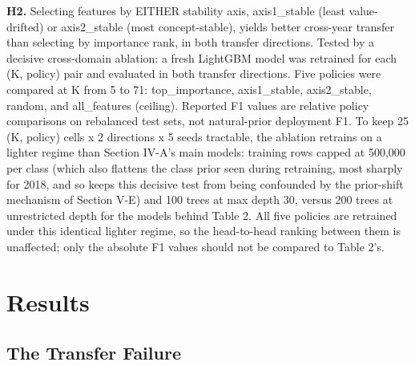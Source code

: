 \documentclass[conference]{IEEEtran}
\begin{document}
\textbf{H2.  }Selecting features by EITHER stability axis, axis1\_\allowbreak{}stable (least value-drifted) or axis2\_\allowbreak{}stable (most concept-stable), yields better cross-year transfer than selecting by importance rank, in both transfer directions. Tested by a decisive cross-domain ablation: a fresh LightGBM model was retrained for each (K, policy) pair and evaluated in both transfer directions. Five policies were compared at K from 5 to 71: top\_\allowbreak{}importance, axis1\_\allowbreak{}stable, axis2\_\allowbreak{}stable, random, and all\_\allowbreak{}features (ceiling). Reported F1 values are relative policy comparisons on rebalanced test sets, not natural-prior deployment F1. To keep 25 (K, policy) cells x 2 directions x 5 seeds tractable, the ablation retrains on a lighter regime than Section IV-A's main models: training rows capped at 500{,}000 per class (which also flattens the class prior seen during retraining, most sharply for 2018, and so keeps this decisive test from being confounded by the prior-shift mechanism of Section V-E) and 100 trees at max depth 30, versus 200 trees at unrestricted depth for the models behind Table 2. All five policies are retrained under this identical lighter regime, so the head-to-head ranking between them is unaffected; only the absolute F1 values should not be compared to Table 2's.\par\medskip

\section{Results}

\subsection{The Transfer Failure}
\end{document}
